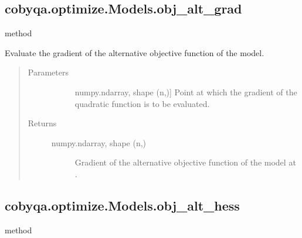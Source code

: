 \documentclass[letterpaper,10pt,english]{sphinxmanual}
\begin{document}
\begin{fulllineitems}
\subsection{cobyqa.optimize.Models.obj\_alt\_grad}
\label{\detokenize{refs/generated/cobyqa.optimize.Models.obj_alt_grad:cobyqa-optimize-models-obj-alt-grad}}\label{\detokenize{refs/generated/cobyqa.optimize.Models.obj_alt_grad::doc}}
\sphinxAtStartPar
method

\begin{fulllineitems}
\label{\detokenize{refs/generated/cobyqa.optimize.Models.obj_alt_grad:cobyqa.optimize.Models.obj_alt_grad}}
\sphinxAtStartPar
Evaluate the gradient of the alternative objective function of the
model.
\begin{quote}\begin{description}
\item[{Parameters}] \leavevmode\begin{description}
\item[{}] \leavevmode{[}numpy.ndarray, shape (n,){]}
\sphinxAtStartPar
Point at which the gradient of the quadratic function is to be
evaluated.

\end{description}

\item[{Returns}] \leavevmode\begin{description}
\item[{numpy.ndarray, shape (n,)}] \leavevmode
\sphinxAtStartPar
Gradient of the alternative objective function of the model at .

\end{description}

\end{description}\end{quote}

\end{fulllineitems}



\subsection{cobyqa.optimize.Models.obj\_alt\_hess}
\label{\detokenize{refs/generated/cobyqa.optimize.Models.obj_alt_hess:cobyqa-optimize-models-obj-alt-hess}}\label{\detokenize{refs/generated/cobyqa.optimize.Models.obj_alt_hess::doc}}
\sphinxAtStartPar
method


\end{fulllineitems}
\end{document}

